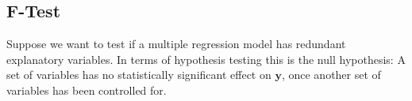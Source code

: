 
\subsection{F-Test}\label{sec:Ftest}
Suppose we want to test if a multiple regression model has redundant explanatory variables.
In terms of hypothesis testing this is the null hypothesis: A set of variables has no statistically significant effect on $\textbf{y}$, once another set of variables has been controlled for.

